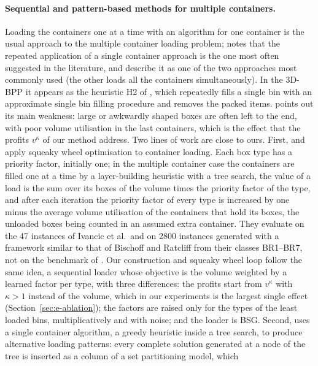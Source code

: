 \paragraph{Sequential and pattern-based methods for multiple containers.}
Loading the containers one at a time with an algorithm for one container is the usual approach to the multiple
container loading problem; \citet{Eley2003} notes that the repeated application of a single container approach is the
one most often suggested in the literature, and \citet{Lim2012} describe it as one of the two approaches most commonly
used (the other loads all the containers simultaneously). In the 3D-BPP it appears as the heuristic H2 of
\citet{Martello2000}, which repeatedly fills a single bin with an approximate single bin filling procedure and removes
the packed items. \citet{Eley2003} points out its main weakness: large or awkwardly shaped boxes are often left to the
end, with poor volume utilisation in the last containers, which is the effect that the profits $v^\kappa$ of our
method address. Two lines of work are
close to ours. First, \citet{LimZhang2005} and \citet{Lim2012} apply squeaky wheel optimisation
\citep{Joslin1999} to container loading. Each box type has a priority factor, initially one; in the multiple
container case the containers are filled one at a time by a layer-building heuristic with a tree search, the value of
a load is the sum over its boxes of the volume times the priority factor of the type, and after each iteration the
priority factor of every type is increased by one minus the average volume utilisation of the containers that hold
its boxes, the unloaded boxes being counted in an assumed extra container. They evaluate on the 47 instances of
Ivancic et al.\ and on 2800 instances generated with a framework similar to that of Bischoff and Ratcliff from their classes BR1--BR7, not on the benchmark of
\citet{Martello2000}. Our construction and squeaky wheel loop follow the same idea, a sequential loader whose
objective is the volume weighted by a learned factor per type, with three differences: the profits start from
$v^\kappa$ with $\kappa>1$ instead of the volume, which in our experiments is the largest single effect
(Section~\ref{sec:e-ablation}); the factors are raised only for the types of the least loaded bins, multiplicatively
and with noise; and the loader is BSG. Second, \citet{Eley2003} uses a
single container algorithm, a greedy heuristic inside a tree search, to produce alternative loading patterns:
every complete solution generated at a node of the tree is inserted as a column of a set partitioning model, which
